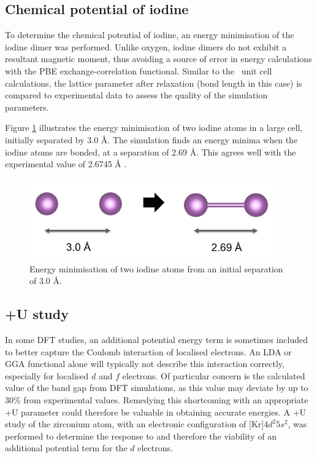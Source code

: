 \subsection{Chemical potential of iodine}

To determine the chemical potential of iodine, an energy minimisation of the iodine dimer was performed. Unlike oxygen, iodine dimers do not exhibit a resultant magnetic moment, thus avoiding a source of error in energy calculations with the PBE exchange-correlation functional. Similar to the \zirconia\ unit cell calculations, the lattice parameter after relaxation (bond length in this case) is compared to experimental data to assess the quality of the simulation parameters.

Figure \ref{figure:iodine_dimer} illustrates the energy minimisation of two iodine atoms in a large cell, initially separated by 3.0 \r{A}. The simulation finds an energy minima when the iodine atoms are bonded, at a separation of 2.69 \r{A}. This agrees well with the experimental value of 2.6745 \r{A} \cite{ukaji1966effect}.

\begin{figure}[htp] %
\centering
\includegraphics[height=3.5cm]{images/iodine_geom.png}
\caption{Energy minimisation of two iodine atoms from an initial separation of 3.0 \r{A}.}
\label{figure:iodine_dimer}
\end{figure}

\subsection{+U study}

In some DFT studies, an additional potential energy term is sometimes included to better capture the Coulomb interaction of localised electrons. An LDA or GGA functional alone will typically not describe this interaction correctly, especially for localised $d$ and $f$ electrons. Of particular concern is the calculated value of the band gap from DFT simulations, as this value may deviate by up to 30\% from experimental values. Remedying this shortcoming with an appropriate +U parameter could therefore be valuable in obtaining accurate energies. A +U study of the zirconium atom, with an electronic configuration of [Kr]$4d^{2}5s^{2}$, was performed to determine the response to and therefore the viability of an additional potential term for the $d$ electrons.

